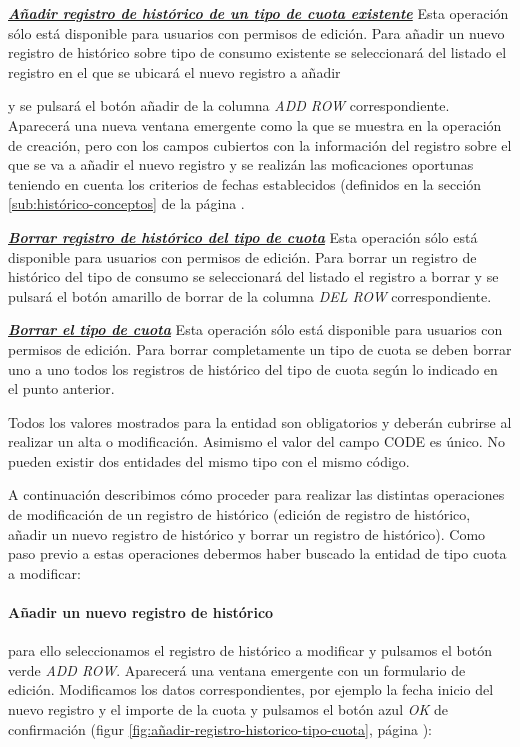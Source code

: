 \underline{\textsl{\textbf{Añadir registro de histórico de un tipo de cuota existente}}}\newline
Esta operación sólo está disponible para usuarios con permisos de edición.
Para añadir un nuevo registro de histórico sobre tipo de consumo existente se seleccionará del listado el registro en el que se ubicará el nuevo registro a añadir 

y se pulsará el botón añadir de la columna \textit{ADD ROW} correspondiente. Aparecerá una nueva ventana emergente como la que se muestra en la operación de creación, pero con los campos cubiertos con la información del registro sobre el que se va a añadir el nuevo registro y se realizán las moficaciones oportunas teniendo en cuenta los criterios de fechas establecidos (definidos en la sección \ref{sub:histórico-conceptos} de la página \pageref{sub:histórico-conceptos}.

\underline{\textsl{\textbf{Borrar registro de histórico del tipo de cuota}}}\newline
Esta operación sólo está disponible para usuarios con permisos de edición.
Para borrar un registro de histórico del tipo de consumo se seleccionará del listado el registro a borrar y se pulsará el botón amarillo de borrar de la columna \textit{DEL ROW} correspondiente.\newline

\underline{\textsl{\textbf{Borrar el tipo de cuota}}}\newline
Esta operación sólo está disponible para usuarios con permisos de edición.
Para borrar completamente un tipo de cuota se deben borrar uno a uno todos los registros de histórico del tipo de cuota según lo indicado en el punto anterior. 

Todos los valores mostrados para la entidad son obligatorios y deberán cubrirse al realizar un alta o modificación. Asimismo el valor del campo CODE es único. No pueden existir dos entidades del mismo tipo con el mismo código.


A continuación describimos cómo proceder para realizar las distintas operaciones de modificación de un registro de histórico (edición de registro de histórico, añadir un nuevo registro de histórico y borrar un registro de histórico). Como paso previo a estas operaciones debermos haber buscado la entidad de tipo cuota a modificar:


\paragraph{Añadir un nuevo registro de histórico} para ello seleccionamos el registro de histórico a modificar y pulsamos el botón verde \emph{ADD ROW}. Aparecerá una ventana emergente con un formulario de edición. Modificamos los datos correspondientes, por ejemplo la fecha inicio del nuevo registro y el importe de la cuota y pulsamos el botón azul \emph{OK} de confirmación (figur \ref{fig:añadir-registro-historico-tipo-cuota}, página \pageref{fig:añadir-registro-historico-tipo-cuota}):

